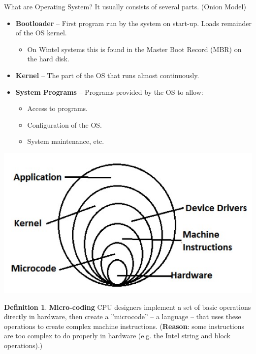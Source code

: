 \documentclass[12pt,a4paper]{article}
\theoremstyle{definition}
\newtheorem{definition}{Definition}[section]
\newenvironment{myitemize}
{ \begin{itemize}
    \setlength{\itemsep}{5pt}
    \setlength{\parskip}{0pt}
    \setlength{\parsep}{0pt}     }
{ \end{itemize}                  }
\begin{document}
\begin{tcolorbox}
	\textsf{What are Operating System?} It usually consists of several parts. (\textsf{Onion Model})
	
	\begin{myitemize}
		\item \textbf{Bootloader} – First program run by the system on start-up. Loads remainder of the OS kernel. 
		\begin{myitemize}
			\item On Wintel systems this is found in the Master Boot Record (MBR) on the hard disk.
		\end{myitemize}
		\item \textbf{Kernel} – The part of the OS that runs almost continuously. 
		\item \textbf{System Programs} – Programs provided by the OS to allow:
		\begin{myitemize}
		\item Access to programs.
		\item Configuration of the OS.
		\item System maintenance, etc.
		\end{myitemize}
	\end{myitemize}
		\includegraphics[scale=0.5]{m1/onionModel}
		\centering
\end{tcolorbox}

\begin{definition}{\textbf{Micro-coding}}
	CPU designers implement a set of basic operations directly in hardware, then create a ''microcode'' – a language – that uses these operations to create complex machine instructions. (\textbf{Reason}: some instructions are too complex to do properly in hardware (e.g. the Intel string and block operations).)
\end{definition}
\end{document}
